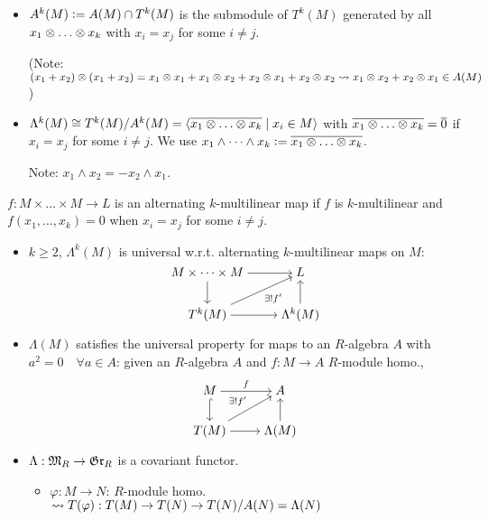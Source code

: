 \begin{itemize}
  \item $A^k(M) \vcentcolon= A(M) \cap T^k(M)$ is the submodule of $T^k(M)$
    generated by all $x_1 \Ot \dots \Ot x_k$ with $x_i = x_j$ for some $i\ne j$.

    (Note: $(x_1+x_2)\otimes(x_1+x_2) = x_1\otimes x_1 + x_1\otimes x_2 + x_2\otimes x_1 +
    x_2\otimes x_2 \leadsto x_1\otimes x_2 + x_2\otimes x_1 \in A(M)$)
  \item $\Lambda^k(M) \cong \quot{T^k(M)}{A^k(M)} = \gen{
    \ob{x_1\Ot \dots \Ot x_k} \mid x_i \in M
    }$ with $\ob{x_1\Ot \dots \Ot x_k} = \ob{0}$ if $x_i = x_j$ for some
    $i\ne j$. We use $x_1 \wedge \dots \wedge x_k \defeq
    \ob{x_1\Ot \dots \Ot x_k}$.

    Note: $x_1 \wedge x_2 = -x_2 \wedge x_1$.
\end{itemize}

\begin{definition}
  $f: M\times \dots \times M \to L$ is an alternating $k$-multilinear map if
  $f$ is $k$-multilinear and $f(x_1, \dots, x_k) = 0$ when $x_i = x_j$ for some
  $i \ne j$.
  \begin{itemize}
    \item $k \ge 2$, $\Lambda^k(M)$ is universal w.r.t. alternating
      $k$-multilinear maps on $M$:
      \[
        \begin{tikzcd}[cramped]
          M\times \dots \times M \arrow{r} \arrow{d} & L \\
          T^k(M) \arrow[swap]{ur}{\exists! f'}
          \arrow{r} & \Lambda^k(M) \arrow{u}
        \end{tikzcd}
      \]
    \item $\Lambda(M)$ satisfies the universal property for maps to an
      $R$-algebra $A$ with $a^2 = 0 \quad \forall a \in A$:
      given an $R$-algebra $A$ and $f:M \to A$ $R$-module homo.,
      \[
        \begin{tikzcd}[cramped]
          M \arrow{r}{f} \arrow[hook]{d} & A \\
          T(M) \arrow{ur}{\exists! f'}
          \arrow{r} & \Lambda(M) \arrow{u}
        \end{tikzcd}
      \]
    \item $\Lambda: \mathfrak{M}_R \to \mathfrak{Gr}_R$ is a covariant functor.
      \begin{itemize}
        \item $\varphi: M \to N$: $R$-module homo. $\leadsto
          T(\varphi): T(M) \to T(N) \to {T(N)}/{A(N)} = \Lambda(N)$
      \end{itemize}
  \end{itemize}
\end{definition}

